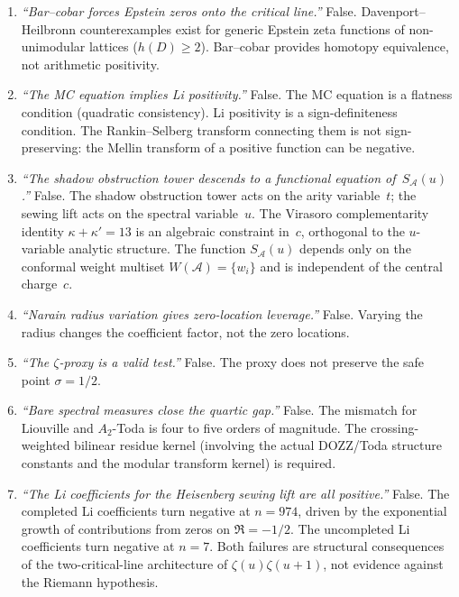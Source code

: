 \documentclass[11pt]{article}
\newcommand{\cA}{\mathcal{A}}
\begin{document}
\begin{enumerate}
\item \emph{``Bar--cobar forces Epstein zeros onto the critical
line.''} False.  Davenport--Heilbronn counterexamples exist for
generic Epstein zeta functions of non-unimodular lattices
($h(D) \ge 2$).  Bar--cobar provides homotopy equivalence, not
arithmetic positivity.

\item \emph{``The MC equation implies Li positivity.''}  False.
The MC equation is a flatness condition (quadratic consistency).
Li positivity is a sign-definiteness condition.  The
Rankin--Selberg transform connecting them is not
sign-preserving: the Mellin transform of a positive function
can be negative.

\item \emph{``The shadow obstruction tower descends to a functional equation
of~$S_\cA(u)$.''}  False.  The shadow obstruction tower acts on the arity
variable~$t$; the sewing lift acts on the spectral
variable~$u$.  The Virasoro complementarity identity
$\kappa + \kappa' = 13$ is an algebraic constraint in~$c$,
orthogonal to the $u$-variable analytic structure.  The function
$S_\cA(u)$ depends only on the conformal weight multiset
$W(\cA) = \{w_i\}$ and is independent of the central
charge~$c$.

\item \emph{``Narain radius variation gives zero-location
leverage.''}  False.  Varying the radius changes the
coefficient factor, not the zero locations.

\item \emph{``The $\zeta$-proxy is a valid test.''}  False.
The proxy does not preserve the safe point $\sigma = 1/2$.

\item \emph{``Bare spectral measures close the quartic gap.''}
False.  The mismatch for Liouville and $A_2$-Toda is four to
five orders of magnitude.  The crossing-weighted bilinear
residue kernel (involving the actual DOZZ/Toda structure
constants and the modular transform kernel) is required.

\item \emph{``The Li coefficients for the Heisenberg sewing lift
are all positive.''}  False.  The completed Li coefficients
turn negative at $n = 974$, driven by the exponential growth
of contributions from zeros on $\Re = -1/2$.  The uncompleted
Li coefficients turn negative at $n = 7$.  Both failures are
structural consequences of the two-critical-line architecture
of $\zeta(u)\zeta(u+1)$, not evidence against the Riemann
hypothesis.
\end{enumerate}
\end{document}
